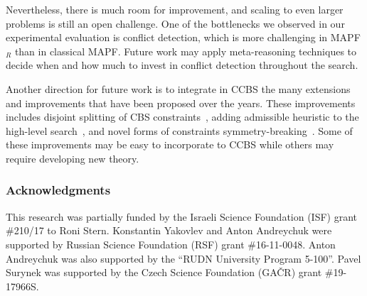 \documentclass[review]{elsarticle}
\newcommand{\mddr}{\ensuremath{MDD_R}\xspace}
\newcommand{\source}{\ensuremath{S}\xspace}
\newcommand{\ccbs}{\ac{CCBS}\xspace}
\newcommand{\cbs}{\ac{CBS}\xspace}
\newcommand{\mapfr}{\ac{MAPF}$_R$\xspace}
\newcommand{\mapf}{\ac{MAPF}\xspace}
\begin{document}
Nevertheless, there is much room for improvement, and scaling to even larger problems is still an open challenge. 
One of the bottlenecks we observed in our experimental evaluation is conflict detection, which is more challenging in \mapfr than in classical \mapf. Future work may apply meta-reasoning techniques to decide when and how much to invest in conflict detection throughout the search. 

Another direction for future work is to integrate in \ccbs the many extensions and improvements that have been proposed over the years. 
These improvements includes disjoint splitting of \cbs constraints~\cite{li2019disjoint}, adding admissible heuristic to the high-level search~\cite{felner2018adding,li2019improved}, and novel forms of constraints symmetry-breaking~\cite{li2020new}. 
Some of these improvements may be easy to incorporate to \ccbs while others may require developing new theory. 










\subsubsection*{Acknowledgments}
This research was partially funded by the Israeli Science Foundation (ISF) grant \#210/17 to Roni Stern. Konstantin Yakovlev and Anton Andreychuk were supported by Russian Science Foundation (RSF) grant \#16-11-0048. Anton Andreychuk was also supported by the ``RUDN University Program 5-100''. Pavel Surynek was supported by the Czech Science Foundation (GA\v{C}R) grant \#19-17966S.

\end{document}

